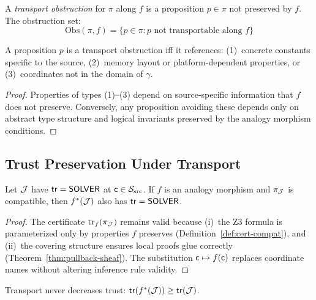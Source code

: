 \documentclass[11pt]{article}
\newcommand{\SourceSite}{\Site_{\mathrm{src}}}
\newcommand{\TransportMap}{\mathrm{tr}}
\newcommand{\ProofCert}{\pi}
\newcommand{\tr}{\mathsf{tr}}
\newcommand{\CompMap}{\gamma}
\begin{document}
\begin{definition}\label{def:transport-obstr}
A \emph{transport obstruction} for $\ProofCert$ along $f$ is a
proposition $p \in \ProofCert$ not preserved by $f$.  The obstruction set:
\[
  \mathrm{Obs}(\ProofCert, f) = \{p \in \ProofCert : p \text{ not
  transportable along } f\}
\]
\end{definition}

\begin{proposition}\label{prop:obstr-char}
A proposition $p$ is a transport obstruction iff it references:
(1)~concrete constants specific to the source,
(2)~memory layout or platform-dependent properties, or
(3)~coordinates not in the domain of $\CompMap$.
\end{proposition}

\begin{proof}
Properties of types (1)--(3) depend on source-specific information that
$f$ does not preserve.  Conversely, any proposition avoiding these
depends only on abstract type structure and logical invariants preserved
by the analogy morphism conditions.
\end{proof}

\subsection{Trust Preservation Under Transport}
\begin{theorem}\label{thm:trust-preservation}
Let $\mathcal{J}$ have $\tr = \Tsolver$ at $\coord \in \SourceSite$.
If $f$ is an analogy morphism and $\ProofCert_{\J}$ is compatible,
then $f^{*}(\mathcal{J})$ also has $\tr = \Tsolver$.
\end{theorem}

\begin{proof}
The certificate $\TransportMap_f(\ProofCert_{\J})$ remains valid
because (i)~the Z3 formula is parameterized only by properties $f$
preserves (Definition~\ref{def:cert-compat}), and (ii)~the covering
structure ensures local proofs glue correctly
(Theorem~\ref{thm:pullback-sheaf}).  The substitution
$\mathsf{c} \mapsto f(\mathsf{c})$ replaces coordinate names without altering
inference rule validity.
\end{proof}

\begin{corollary}\label{cor:trust-mono}
Transport never decreases trust: $\tr(f^{*}(\J)) \geq \tr(\J)$.
\end{corollary}
\end{document}
